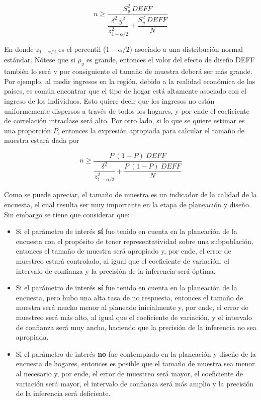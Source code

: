 \documentclass[
  10pt,
  spanish,
]{book}
\providecommand{\tightlist}{%
  \setlength{\itemsep}{0pt}\setlength{\parskip}{0pt}}
\begin{document}
\[ 
n \geq \dfrac{S^2_{y}\ DEFF}{\dfrac{\delta^2 \  \bar{y}^2}{z_{1-\alpha/2}^2}+\dfrac{S^2_{y}\ DEFF}{N}}
\]

En donde \(z_{1-\alpha/2}\) es el percentil (\(1- \alpha/2\)) asociado a una distribución normal estándar. Nótese que si \(\rho_y\) es grande, entonces el valor del efecto de diseño DEFF también lo será y por consiguiente el tamaño de muestra deberá ser más grande. Por ejemplo, al medir ingresos en la región, debido a la realidad económica de los países, es común encontrar que el tipo de hogar está altamente asociado con el ingreso de los individuos. Esto quiere decir que los ingresos no están uniformemente dispersos a través de todos los hogares, y por ende el coeficiente de correlación intraclase será alto. Por otro lado, si lo que se quiere estimar es una proporción \(P\), entonces la expresión apropiada para calcular el tamaño de muestra estará dada por

\[ 
n \geq \dfrac{P\ (1-P)\ DEFF}{\dfrac{\delta^2}{z_{1-\alpha/2}^2 }+\dfrac{P\ (1-P) \ DEFF}{N}}
\]

Como se puede apreciar, el tamaño de muestra es un indicador de la calidad de la encuesta, el cual resulta ser muy importante en la etapa de planeación y diseño. Sin embargo se tiene que considerar que:

\begin{itemize}
\tightlist
\item
  Si el parámetro de interés \textbf{sí} fue tenido en cuenta en la planeación de la encuesta con el propósito de tener representatividad sobre una subpoblación, entonces el tamaño de muestra será apropiado y, por ende, el error de muestreo estará controlado, al igual que el coeficiente de variación, el intervalo de confianza y la precisión de la inferencia será óptima.
\item
  Si el parámetro de interés \textbf{sí} fue tenido en cuenta en la planeación de la encuesta, pero hubo una alta tasa de no respuesta, entonces el tamaño de muestra será mucho menor al planeado inicialmente y, por ende, el error de muestreo será más alto, al igual que el coeficiente de variación, y el intervalo de confianza será muy ancho, haciendo que la precisión de la inferencia no sea apropiada.
\item
  Si el parámetro de interés \textbf{no} fue contemplado en la planeación y diseño de la encuesta de hogares, entonces es posible que el tamaño de muestra sea menor al necesario y, por ende, el error de muestreo será mayor, el coeficiente de variación será mayor, el intervalo de confianza será más amplio y la precisión de la inferencia será deficiente.
\end{itemize}
\end{document}
